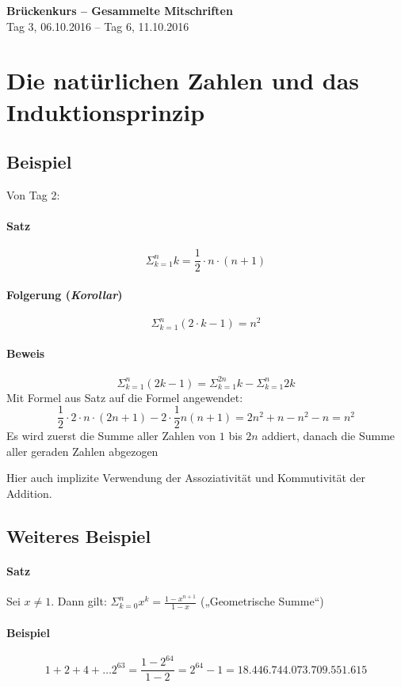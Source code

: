\documentclass[14pt,a4paper]{article}
\begin{document}
	\begin{center}
		\Huge{\textbf{Brückenkurs – Gesammelte Mitschriften}}\\
		\normalsize{Tag 3, 06.10.2016 – Tag 6, 11.10.2016}
	\end{center}
	\par

	\section{Die natürlichen Zahlen und das Induktionsprinzip}
	\subsection{Beispiel}
		Von Tag 2:
			\paragraph{Satz}
				$$ \Sigma_{k=1}^{n} k = \frac{1}{2} \cdot n \cdot (n + 1) $$
			\paragraph{Folgerung (\textit{Korollar})}
				$$ \Sigma_{k=1}^{n} ( 2 \cdot k -1 ) = n^2 $$
			\paragraph{Beweis}
				$$ \Sigma_{k=1}^{n} (2k-1) = \Sigma_{k=1}^{2n} k - \Sigma_{k=1}^{n} 2k $$
				Mit Formel aus Satz auf die Formel angewendet:
				$$ \frac{1}{2} \cdot 2 \cdot n \cdot (2n+1) -2 \cdot \frac{1}{2} n(n+1) = 2n^2 + n - n^2 -n = n^2 $$
				Es wird zuerst die Summe aller Zahlen von $1$ bis $2n$ addiert, danach die Summe aller geraden Zahlen abgezogen

				Hier auch implizite Verwendung der Assoziativität und Kommutivität der Addition.

	\subsection{Weiteres Beispiel}
		\paragraph{Satz} Sei $ x \neq 1 $. Dann gilt: $\Sigma_{k=0}^{n} x^k = \frac{1-x^{n+1}}{1-x} $ („Geometrische Summe“)
		\paragraph{Beispiel}
			$$ 1 + 2 + 4 + \dots 2^{63} = \frac{1-2^{64}}{1-2} = 2^{64} - 1 = 18.446.744.073.709.551.615 $$
\end{document}

